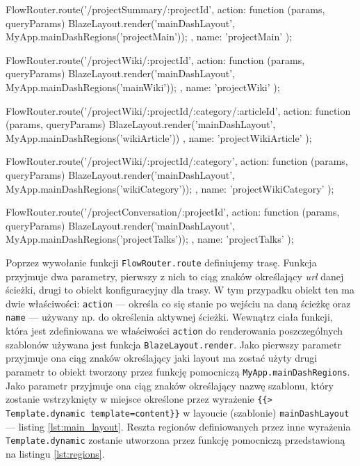 \begin{js}[caption={Definicja przykładowego routingu},label={lst:routing}]
FlowRouter.route('/projectSummary/:projectId', {
    action: function (params, queryParams) {
        BlazeLayout.render('mainDashLayout', MyApp.mainDashRegions('projectMain'));
    },
    name: 'projectMain'
});

FlowRouter.route('/projectWiki/:projectId', {
    action: function (params, queryParams) {
        BlazeLayout.render('mainDashLayout', MyApp.mainDashRegions('mainWiki'));
    },
    name: 'projectWiki'
});

FlowRouter.route('/projectWiki/:projectId/:category/:articleId', {
    action: function (params, queryParams) {
        BlazeLayout.render('mainDashLayout', MyApp.mainDashRegions('wikiArticle'))
    },
    name: 'projectWikiArticle'
});

FlowRouter.route('/projectWiki/:projectId/:category', {
    action: function (params, queryParams) {
        BlazeLayout.render('mainDashLayout', MyApp.mainDashRegions('wikiCategory'));
    },
    name: 'projectWikiCategory'
});

FlowRouter.route('/projectConversation/:projectId', {
    action: function (params, queryParams) {
        BlazeLayout.render('mainDashLayout', MyApp.mainDashRegions('projectTalks'));
    },
    name: 'projectTalks'
});
\end{js}
Poprzez wywołanie funkcji \verb|FlowRouter.route| definiujemy trasę. Funkcja przyjmuje dwa parametry, pierwszy z nich to ciąg znaków określający \textit{url} danej ścieżki, drugi to obiekt konfiguracyjny dla trasy. W tym przypadku obiekt ten ma dwie właściwości: \verb|action| --- określa co się stanie po wejściu na daną ścieżkę oraz \verb|name| --- używany np. do określenia aktywnej ścieżki. Wewnątrz ciała funkcji, która jest zdefiniowana we właściwości \verb|action| do renderowania poszczególnych szablonów używana jest funkcja \verb|BlazeLayout.render|. Jako pierwszy parametr przyjmuje ona ciąg znaków określający jaki layout ma zostać użyty drugi parametr to obiekt tworzony przez funkcję pomocniczą \verb|MyApp.mainDashRegions|. Jako parametr przyjmuje ona ciąg znaków określający nazwę szablonu, który zostanie wstrzyknięty w miejsce określone przez wyrażenie \verb|{{> Template.dynamic template=content}}| w layoucie (szablonie) \verb|mainDashLayout| --- listing \ref{lst:main_layout}. Reszta regionów definiowanych przez inne wyrażenia \verb|Template.dynamic| zostanie utworzona przez funkcję pomocniczą przedstawioną na listingu \ref{lst:regions}.

